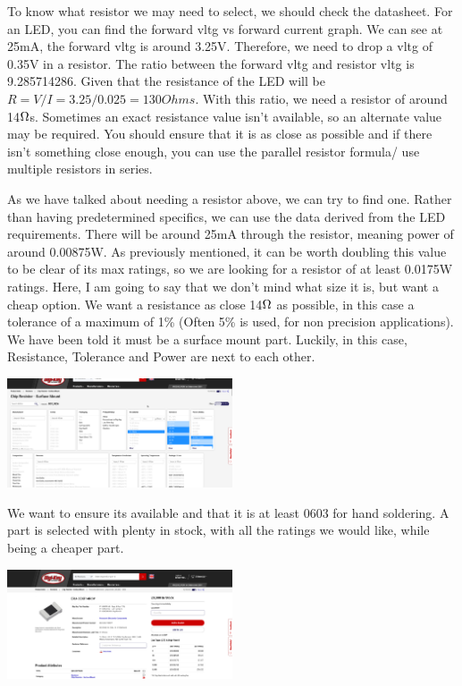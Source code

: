 \documentclass[a4paper,11pt]{report}
\begin{document}
To know what resistor we may need to select, we should check the datasheet. For an LED, you can find the forward \gls{vltg} vs forward current graph. We can see at 25mA, the forward \gls{vltg} is around 3.25V. Therefore, we need to drop a \gls{vltg} of 0.35V in a resistor. The ratio between the forward \gls{vltg} and resistor \gls{vltg} is 9.285714286. Given that the resistance of the LED will be $R=V/I=3.25/0.025=130Ohms$. With this ratio, we need a resistor of around 14$\ohm$s. Sometimes an exact resistance value isn't available, so an alternate value may be required. You should ensure that it is as close as possible and if there isn't something close enough, you can use the parallel resistor formula/ use multiple resistors in series.

As we have talked about needing a resistor above, we can try to find one. Rather than having predetermined specifics, we can use the data derived from the LED requirements. There will be around 25mA through the resistor, meaning power of around 0.00875W. As previously mentioned, it can be worth doubling this value to be clear of its max ratings, so we are looking for a resistor of at least 0.0175W ratings. Here, I am going to say that we don't mind what size it is, but want a cheap option. We want a resistance as close 14$\ohm$ as possible, in this case a tolerance of a maximum of 1\% (Often 5\% is used, for non precision applications). We have been told it must be a surface mount part. Luckily, in this case, Resistance, Tolerance and Power are next to each other.

\includegraphics[width=0.5\textwidth]{screenshots/DigiKeyResistor}

We want to ensure its available and that it is at least 0603 for hand soldering. A part is selected with plenty in stock, with all the ratings we would like, while being a cheaper part.

\includegraphics[width=0.5\textwidth]{screenshots/DigiKeyResistorSelected}
\end{document}
